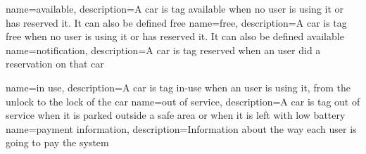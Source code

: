 {
	name={available},
	description={A car is tag available when no user is using it or has reserved it. It can also be defined free}
}
{
	name={free},
	description={A car is tag free when no user is using it or has reserved it. It can also be defined available}
}
{
	name={notification},
	description={A car is tag reserved when an user did a reservation on that car}
}

{
	name={in use},
	description={A car is tag in-use when an user is using it, from the unlock to the lock of the car}
}
{
	name={out of service},
	description={A car is tag out of service when it is parked outside a safe area or when it is left with low battery}
}
{
	name={payment information},
	description={Information about the way each user is going to pay the system }
}
\begin{comment}
\newglossaryentry{battery}
{
  name={battery},
  description={},
  plural={batteries}
}
\end{comment}




